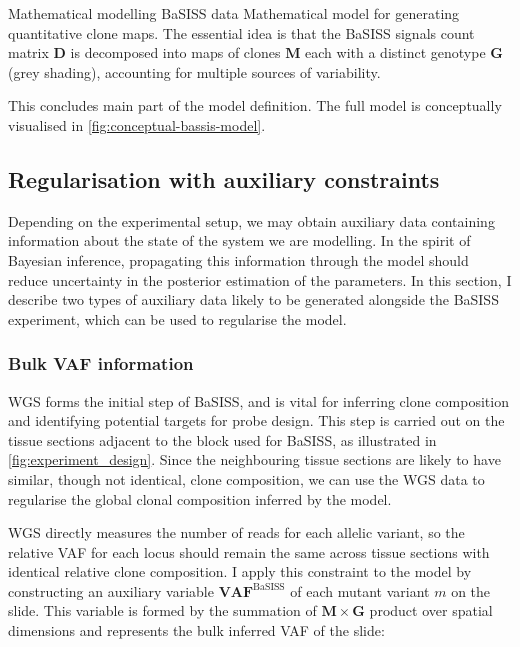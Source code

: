     {Mathematical modelling \ac{BaSISS} data}
    {Mathematical model for generating quantitative clone maps. The essential idea is that the \ac{BaSISS} signals count matrix $\mathbf{D}$ is decomposed into maps of clones $\mathbf{M}$ each with
    a distinct genotype $\mathbf{G}$ (grey shading), accounting for multiple sources of variability.}


This concludes main part of the model definition. The full model is conceptually visualised in \cref{fig:conceptual-bassis-model}.

\subsection{Regularisation with auxiliary constraints}
Depending on the experimental setup, we may obtain auxiliary data containing information about the state of the system we are modelling. In the spirit of Bayesian inference, propagating this information through the model should reduce uncertainty in the posterior estimation of the parameters. In this section, I describe two types of auxiliary data likely to be generated alongside the \ac{BaSISS} experiment, which can be used to regularise the model.

\subsubsection*{Bulk \acl{VAF} information}

\ac{WGS} forms the initial step of \ac{BaSISS}, and is vital for inferring clone composition and identifying potential targets for probe design. This step is carried out on the tissue sections adjacent to the block used for \ac{BaSISS}, as illustrated in \cref{fig:experiment_design}. Since the neighbouring tissue sections are likely to have similar, though not identical, clone composition, we can use the \ac{WGS} data to regularise the global clonal composition inferred by the model.

\ac{WGS} directly measures the number of reads for each allelic variant, so the relative \acf{VAF} for each locus should remain the same across tissue sections with identical relative clone composition. I apply this constraint to the model by constructing an auxiliary variable $\mathbf{VAF}^{\text{BaSISS}}$ of each mutant variant $m$ on the slide. This variable is formed by the summation of $\mathbf{M} \times \mathbf{G}$ product over spatial dimensions and represents the bulk inferred \ac{VAF} of the slide:

